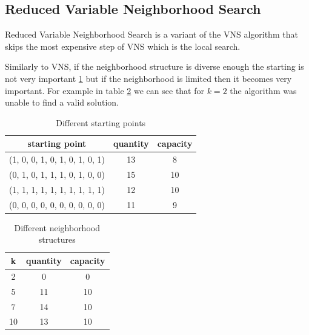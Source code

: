 \subsection{Reduced Variable Neighborhood Search}
Reduced Variable Neighborhood Search is a variant of the VNS algorithm that skips the most expensive step of VNS which is the local search.

Similarly to VNS, if the neighborhood structure is diverse enough the starting is not very important \ref{tab:rvns-start} but if the neighborhood is limited then it becomes very important. For example in table \ref{tab:rvns-neigh} we can see that for $k=2$ the algorithm was unable to find a valid solution.
\begin{table}[H]
    \centering
    \begin{tabular}{c||c |c}
        starting point                 & quantity & capacity \\ \hline
        (1, 0, 0, 1, 0, 1, 0, 1, 0, 1) & 13       & 8        \\
        (0, 1, 0, 1, 1, 1, 0, 1, 0, 0) & 15       & 10       \\
        (1, 1, 1, 1, 1, 1, 1, 1, 1, 1) & 12       & 10       \\
        (0, 0, 0, 0, 0, 0, 0, 0, 0, 0) & 11       & 9        \\
    \end{tabular}
    \caption{Different starting points}
    \label{tab:rvns-start}
\end{table}
\begin{table}[H]
    \centering
    \begin{tabular}{c||c |c}
        k  & quantity & capacity \\ \hline
        2  & 0        & 0        \\
        5  & 11       & 10       \\
        7  & 14       & 10       \\
        10 & 13       & 10       \\
    \end{tabular}
    \caption{Different neighborhood structures}
    \label{tab:rvns-neigh}
\end{table}